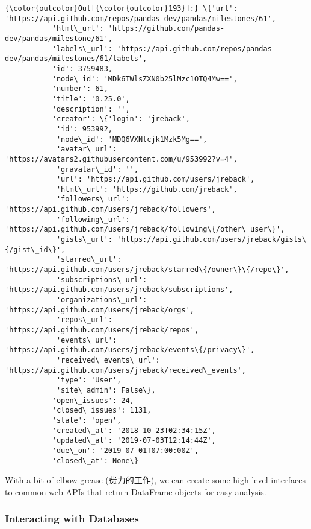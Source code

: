 \documentclass[11pt]{article}
\begin{document}
\begin{Verbatim}[commandchars=\\\{\}]
{\color{outcolor}Out[{\color{outcolor}193}]:} \{'url': 'https://api.github.com/repos/pandas-dev/pandas/milestones/61',
           'html\_url': 'https://github.com/pandas-dev/pandas/milestone/61',
           'labels\_url': 'https://api.github.com/repos/pandas-dev/pandas/milestones/61/labels',
           'id': 3759483,
           'node\_id': 'MDk6TWlsZXN0b25lMzc1OTQ4Mw==',
           'number': 61,
           'title': '0.25.0',
           'description': '',
           'creator': \{'login': 'jreback',
            'id': 953992,
            'node\_id': 'MDQ6VXNlcjk1Mzk5Mg==',
            'avatar\_url': 'https://avatars2.githubusercontent.com/u/953992?v=4',
            'gravatar\_id': '',
            'url': 'https://api.github.com/users/jreback',
            'html\_url': 'https://github.com/jreback',
            'followers\_url': 'https://api.github.com/users/jreback/followers',
            'following\_url': 'https://api.github.com/users/jreback/following\{/other\_user\}',
            'gists\_url': 'https://api.github.com/users/jreback/gists\{/gist\_id\}',
            'starred\_url': 'https://api.github.com/users/jreback/starred\{/owner\}\{/repo\}',
            'subscriptions\_url': 'https://api.github.com/users/jreback/subscriptions',
            'organizations\_url': 'https://api.github.com/users/jreback/orgs',
            'repos\_url': 'https://api.github.com/users/jreback/repos',
            'events\_url': 'https://api.github.com/users/jreback/events\{/privacy\}',
            'received\_events\_url': 'https://api.github.com/users/jreback/received\_events',
            'type': 'User',
            'site\_admin': False\},
           'open\_issues': 24,
           'closed\_issues': 1131,
           'state': 'open',
           'created\_at': '2018-10-23T02:34:15Z',
           'updated\_at': '2019-07-03T12:14:44Z',
           'due\_on': '2019-07-01T07:00:00Z',
           'closed\_at': None\}
\end{Verbatim}
            
    With a bit of elbow grease (费力的工作), we can create some high-level
interfaces to common web APIs that return DataFrame objects for easy
analysis.

    \hypertarget{interacting-with-databases}{%
\subsubsection{Interacting with
Databases}\label{interacting-with-databases}}
\end{document}
